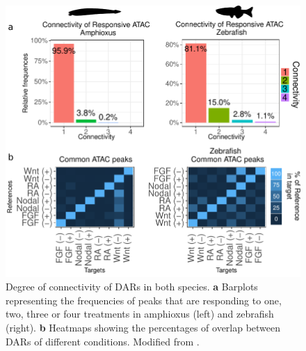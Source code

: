  
\begin{figure}[hp]
\centering
\includegraphics[width=1\textwidth]{Figures/ATAC_connectivity}
\caption[Connectivity of DARs in both species]{ Degree of connectivity of DARs in both species. \textbf{a} Barplots representing the frequencies of peaks that are responding to one, two, three or four treatments in amphioxus (left) and zebrafish (right). \textbf{b} Heatmaps showing the percentages of overlap between DARs of different conditions. Modified from \parencite{gil-galvez_gain_2022}.
}
\label{fig:ATAC_connectivity}
\end{figure} 



